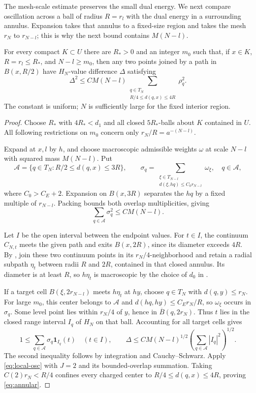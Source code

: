 The mesh-scale estimate preserves the small dual energy. We next
compare oscillation across a ball of radius $R=r_l$ with the dual
energy in a surrounding annulus. Expansion takes that annulus to a
fixed-size region and takes the mesh $r_N$ to $r_{N-l}$; this is why
the next bound contains $M(N-l)$.

\begin{lemma}
\label{lem:annular}
For every compact $K\subset U$ there are $R_*>0$ and an integer
$m_0$ such that, if $x\in K$, $R=r_l\leq R_*$, and $N-l\geq m_0$,
then any two points joined by a path in $B(x,R/2)$ have
$H_N$-value difference $\Delta$ satisfying
\begin{equation}
 \Delta^2\leq C M(N-l)
       \sum_{\substack{q\in T_N\\R/4\leq d(q,x)\leq4R}}\rho_q^2.
 \label{eq:annular}
\end{equation}
The constant is uniform; $N$ is sufficiently large for the fixed
interior region.
\end{lemma}
\begin{proof}
Choose $R_*$ with $4R_*<d_1$ and all closed $5R_*$-balls about
$K$ contained in $U$. All following restrictions on $m_0$ concern
only $r_N/R=a^{-(N-l)}$.

Expand at $x,l$ by $h$, and choose macroscopic admissible weights
$\omega$ at scale $N-l$ with squared mass $M(N-l)$. Put
\[
 \mathcal A=\{q\in T_N:R/2\leq d(q,x)\leq3R\},\qquad
 \sigma_q=\sum_{\substack{\xi\in T_{N-l}\\
               d(\xi,hq)\leq C_0r_{N-l}}}\omega_\xi,
 \quad q\in\mathcal A,
\]
where $C_0>C_E+2$. Expansion on $B(x,3R)$ separates the $hq$ by
a fixed multiple of $r_{N-l}$. Packing bounds both overlap
multiplicities, giving
\[
 \sum_{q\in\mathcal A}\sigma_q^2\leq C M(N-l).
\]

Let $I$ be the open interval between the endpoint values. For $t\in I$,
the continuum $C_{N,t}$ meets the given path and exits $B(x,2R)$,
since its diameter exceeds $4R$. By , join these
two continuum points in its $r_N/4$-neighborhood and retain a radial
subpath $\eta_t$ between radii $R$ and $2R$, contained in that closed
annulus. Its diameter is at least $R$, so $h\eta_t$ is macroscopic
by the choice of $d_0$ in .

If a target cell $B(\xi,2r_{N-l})$ meets $h\eta_t$ at $hy$,
choose $q\in T_N$ with $d(q,y)\leq r_N$. For large $m_0$, this
center belongs to $\mathcal A$ and
$d(hq,hy)\leq C_Er_N/R$, so $\omega_\xi$ occurs in $\sigma_q$.
Some level point lies within $r_N/4$ of $y$, hence in
$\overline B(q,2r_N)$. Thus $t$ lies in the closed range interval
$I_q$ of $H_N$ on that ball. Accounting for all target cells gives
\[
 1\leq\sum_{q\in\mathcal A}\sigma_q\mathbf1_{I_q}(t)
 \quad(t\in I),
 \qquad
 \Delta\leq C M(N-l)^{1/2}
       \left(\sum_{q\in\mathcal A}|I_q|^2\right)^{1/2}.
\]
The second inequality follows by integration and Cauchy--Schwarz.
Apply \eqref{eq:local-osc} with $J=2$ and its bounded-overlap
summation. Taking $C(2)r_N<R/4$ confines every charged center to
$R/4\leq d(q,x)\leq4R$, proving \eqref{eq:annular}.
\end{proof}

